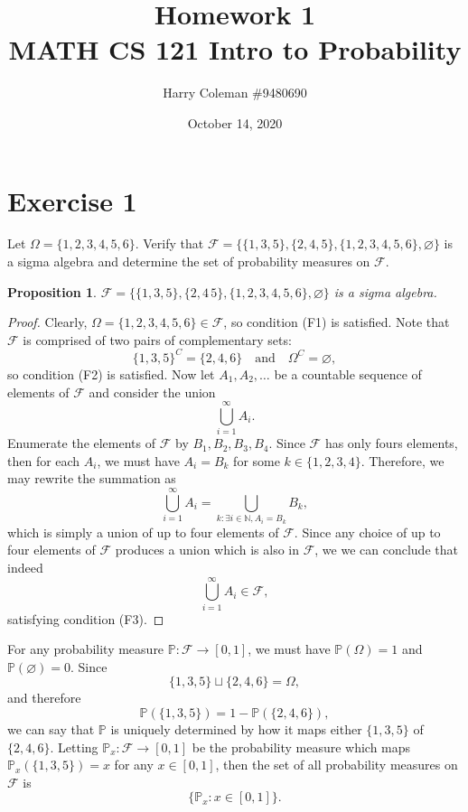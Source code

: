 \documentclass[12pt]{article}
\newtheorem{proposition}{Proposition}
\newenvironment{problem}
    {\begin{lrbox}{\mybox}\begin{minipage}{\textwidth-10pt}}
    {\end{minipage}\end{lrbox}\framebox[6.5in]{\usebox{\mybox}}}
\newcommand{\isp}[1]{\quad\text{#1}\quad}
\newcommand{\N}{\mathbb{N}}
\let\emptyset\varnothing
\newcommand{\FF}{\mathcal{F}}
\renewcommand{\P}{\mathbb{P}}
\begin{document}
 
\title{Homework 1\\
    \large MATH CS 121 Intro to Probability
}
\author{Harry Coleman \#9480690}
\date{October 14, 2020}
\maketitle

\section*{Exercise 1}
\begin{problem}
    Let $\Omega = \{1,2,3,4,5,6\}$. Verify that $\FF=\{\{1,3,5\},\{2,4,5\},\{1,2,3,4,5,6\},\emptyset\}$ is a sigma algebra and determine the set of probability measures on $\FF$.
\end{problem}

\begin{proposition}
    $\FF=\{\{1,3,5\},\{2,4\,5\},\{1,2,3,4,5,6\},\emptyset\}$ is a sigma algebra.
\end{proposition}

\begin{proof}
    Clearly, $\Omega=\{1,2,3,4,5,6\}\in\FF$, so condition (F1) is satisfied. Note that $\FF$ is comprised of two pairs of complementary sets:
    \[\{1,3,5\}^C = \{2,4,6\} \isp{and} \Omega^C = \emptyset,\]
    so condition (F2) is satisfied. Now let $A_1,A_2,\dots$ be a countable sequence of elements of $\FF$ and consider the union
    \[\bigcup_{i=1}^\infty A_i.\]
    Enumerate the elements of $\FF$ by $B_1,B_2,B_3,B_4$. Since $\FF$ has only fours elements, then for each $A_i$, we must have $A_i=B_k$ for some $k\in\{1,2,3,4\}$. Therefore, we may rewrite the summation as
    \[\bigcup_{i=1}^\infty A_i = \bigcup_{k:\exists i\in\N,A_i=B_k}B_k,\]
    which is simply a union of up to four elements of $\FF$. Since any choice of up to four elements of $\FF$ produces a union which is also in $\FF$, we we can conclude that indeed
    \[\bigcup_{i=1}^\infty A_i \in \FF,\]
    satisfying condition (F3).
    
\end{proof}

For any probability measure $\P:\FF\to[0,1]$, we must have $\P(\Omega)=1$ and $\P(\emptyset)=0$. Since
\[\{1,3,5\}\sqcup\{2,4,6\} = \Omega,\]
and therefore
\[\P(\{1,3,5\}) = 1-\P(\{2,4,6\}),\]
we can say that $\P$ is uniquely determined by how it maps either $\{1,3,5\}$ of $\{2,4,6\}$. Letting $\P_x:\FF\to[0,1]$ be the probability measure which maps $\P_x(\{1,3,5\}) = x$ for any $x\in[0,1]$, then the set of all probability measures on $\FF$ is
\[\{\P_x : x\in[0,1]\}.\]
\end{document}
